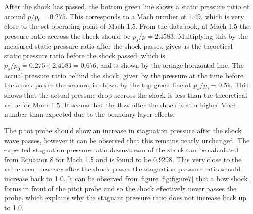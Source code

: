 \documentclass[8pt]{article}
\begin{document}
After the shock has passed, the bottom green line shows a static pressure ratio of around $p/p_0 = 0.275$. This corresponds to a Mach number of 1.49, which is very close to the set operating point of Mach 1.5.
From the databook, at Mach 1.5 the pressure ratio accross the shock should be $p_s/p = 2.4583$.
Multiplying this by the measured static pressure ratio after the shock passes, gives us the theoetical static pressure ratio before the shock passed, which is $p_s/p_0 = 0.275 \times 2.4583 = 0.676$, and is shown by the orange horizontal line.
The actual pressure ratio behind the shock, given by the pressure at the time before the shock passes the sensors, is shown by the top green line at $p_s/p_0 = 0.59$.
This shows that the actual pressure drop accross the shock is less than the theoretical value for Mach 1.5.
It seems that the flow after the shock is at a higher Mach number than expected due to the boundary layer effects.

The pitot probe should show an increase in stagnation pressure after the shock wave passes, however it can be observed that this remains nearly unchanged.
The expected stagnation pressure ratio downstream of the shock can be calculated from Equation 8 for Mach 1.5 and is found to be 0.9298. This very close to the value seen, however after the shock passes the stagnation pressure ratio should increase back to 1.0.
It can be observed from figure \ref{fig:figure7} that a bow shock forms in front of the pitot probe and so the shock effectively never passes the probe, which explains why the stagnant pressure ratio does not increase back up to 1.0.
\end{document}
